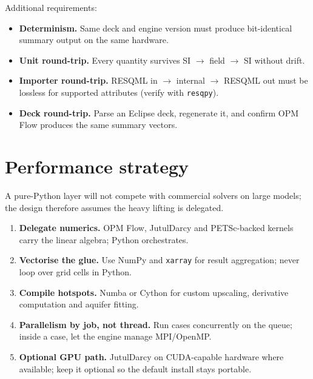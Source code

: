 \documentclass[11pt,a4paper]{article}
\begin{document}
\noindent Additional requirements:
\begin{itemize}[leftmargin=1.4em]
  \item \textbf{Determinism.} Same deck and engine version must produce
        bit-identical summary output on the same hardware.
  \item \textbf{Unit round-trip.} Every quantity survives
        SI $\rightarrow$ field $\rightarrow$ SI without drift.
  \item \textbf{Importer round-trip.} RESQML in $\rightarrow$ internal $\rightarrow$
        RESQML out must be lossless for supported attributes (verify with \texttt{resqpy}).
  \item \textbf{Deck round-trip.} Parse an Eclipse deck, regenerate it, and
        confirm OPM Flow produces the same summary vectors.
\end{itemize}

\section{Performance strategy}

A pure-Python layer will not compete with commercial solvers on large models;
the design therefore assumes the heavy lifting is delegated.

\begin{enumerate}[leftmargin=1.4em]
  \item \textbf{Delegate numerics.} OPM Flow, JutulDarcy and PETSc-backed
        kernels carry the linear algebra; Python orchestrates.
  \item \textbf{Vectorise the glue.} Use NumPy and \texttt{xarray} for result
        aggregation; never loop over grid cells in Python.
  \item \textbf{Compile hotspots.} Numba or Cython for custom upscaling,
        derivative computation and aquifer fitting.
  \item \textbf{Parallelism by job, not thread.} Run cases concurrently on the
        queue; inside a case, let the engine manage MPI/OpenMP.
  \item \textbf{Optional GPU path.} JutulDarcy on CUDA-capable hardware where
        available; keep it optional so the default install stays portable.
\end{enumerate}

\end{document}
